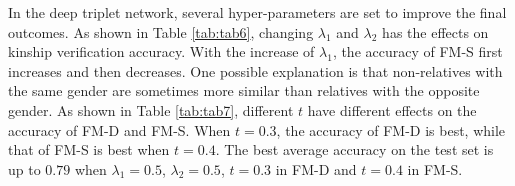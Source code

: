 \documentclass[a4paper, 10pt, conference]{ieeeconf}      %
\begin{document}
In the deep triplet network, several hyper-parameters are set to improve the final outcomes. As shown in Table \ref{tab:tab6}, changing ${\lambda}{_1}$ and ${\lambda}{_2}$ has the effects on kinship verification accuracy. With the increase of ${\lambda}{_1}$, the accuracy of FM-S first increases and then decreases. One possible explanation is that non-relatives with the same gender are sometimes more similar than relatives with the opposite gender. As shown in Table \ref{tab:tab7}, different $t$ have different effects on the accuracy of FM-D and FM-S. When $t=0.3$, the accuracy of FM-D is best, while that of FM-S is best when $t=0.4$. The best average accuracy on the test set is up to $0.79$ when ${\lambda}{_1}=0.5$, ${\lambda}{_2}=0.5$, $t=0.3$ in FM-D and $t=0.4$ in FM-S.


\begin{table}[t]
\small
\setlength{\abovecaptionskip}{0.0cm}
\setlength{\belowcaptionskip}{0.0cm}
\renewcommand\arraystretch{1.4}
\linespread{0.8}
\centering
\caption{Leaderboard of RFIW Tri-Subject Verification.}
\label{tab:tab8}
\end{table}
\end{document}
